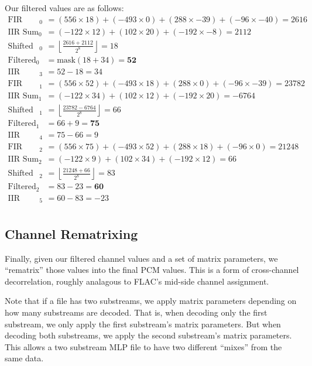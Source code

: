 Our filtered values are as follows:
\begin{align*}
\text{FIR Sum}_0 &= (556 \times 18) + (-493 \times 0) + (288 \times -39) + (-96 \times -40) = 2616 \\
\text{IIR Sum}_0 &= (-122 \times 12) + (102 \times 20) + (-192 \times -8) = 2112 \\
\text{Shifted Sum}_0 &= \left\lfloor\frac{2616 + 2112}{2 ^ 8}\right\rfloor = 18 \\
\text{Filtered}_0 &= \text{mask}(18 + 34) = \textbf{52} \\
\text{IIR State}_3 &= 52 - 18 = 34 \\
\text{FIR Sum}_1 &= (556 \times 52) + (-493 \times 18) + (288 \times 0) + (-96 \times -39) = 23782 \\
\text{IIR Sum}_1 &= (-122 \times 34) + (102 \times 12) + (-192 \times 20) = -6764 \\
\text{Shifted Sum}_1 &= \left\lfloor\frac{23782 - 6764}{2 ^ 8}\right\rfloor = 66 \\
\text{Filtered}_1 &= 66 + 9 = \textbf{75} \\
\text{IIR State}_4 &= 75 - 66 = 9 \\
\text{FIR Sum}_2 &= (556 \times 75) + (-493 \times 52) + (288 \times 18) + (-96 \times 0) = 21248 \\
\text{IIR Sum}_2 &= (-122 \times 9) + (102 \times 34) + (-192 \times 12) = 66 \\
\text{Shifted Sum}_2 &= \left\lfloor\frac{21248 + 66}{2 ^ 8}\right\rfloor = 83 \\
\text{Filtered}_2 &= 83 - 23 = \textbf{60} \\
\text{IIR State}_5 &= 60 - 83 = -23 \\
\end{align*}

\clearpage

\subsection{Channel Rematrixing}

Finally, given our filtered channel values and a set of matrix parameters,
we ``rematrix'' those values into the final PCM values.
This is a form of cross-channel decorrelation, roughly analagous
to FLAC's mid-side channel assignment.

Note that if a file has two substreams, we apply matrix parameters
depending on how many substreams are decoded.
That is, when decoding only the first substream, we only apply
the first substream's matrix parameters.
But when decoding both substreams, we apply the second substream's
matrix parameters.
This allows a two substream MLP file to have two different ``mixes''
from the same data.

